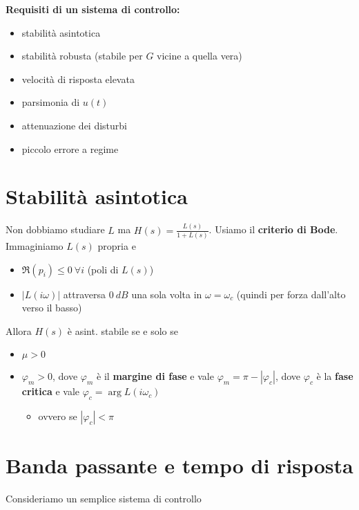 \textbf{Requisiti di un sistema di controllo:}
\begin{itemize}
	\item stabilità asintotica
	\item stabilità robusta (stabile per $G$ vicine a quella vera)
	\item velocità di risposta elevata
	\item parsimonia di $u(t)$
	\item attenuazione dei disturbi
	\item piccolo errore a regime
\end{itemize}

\section{Stabilità asintotica}

Non dobbiamo studiare $L$ ma $H(s) =\frac{L(s)}{1+L(s)}$. Usiamo il \textbf{criterio di Bode}. Immaginiamo $L(s)$ propria e
\begin{itemize}
	\item $\Re(p_i) \leq 0\ \forall i$ (poli di $L(s)$)
	\item $| L(i\omega)| $ attraversa $0\ \si{dB}$ una sola volta in $\omega =\omega _c$ (quindi per forza dall'alto verso il basso)
\end{itemize}

Allora $H(s)$ è asint. stabile se e solo se
\begin{itemize}
	\item $\mu  >0$
	\item $\varphi _m  >0$, dove $\varphi _m$ è il \textbf{margine di fase} e vale $\varphi _m =\pi -| \varphi _c| $, dove $\varphi _c$ è la \textbf{fase critica} e vale $\varphi _c =\arg L(i\omega _c)$
	      \begin{itemize}
	      	\item ovvero se $| \varphi _c| < \pi $
	      \end{itemize}
\end{itemize}

\section{Banda passante e tempo di risposta}

Consideriamo un semplice sistema di controllo

